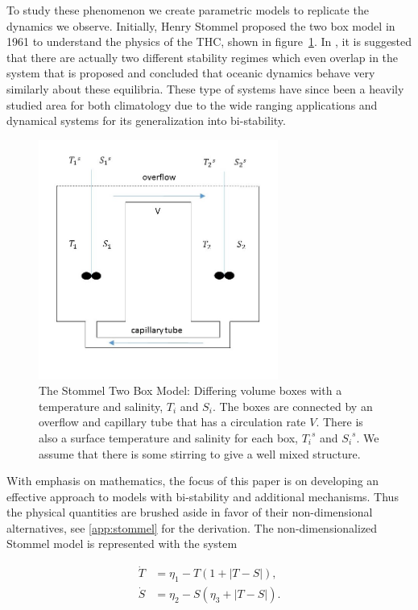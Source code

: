 To study these phenomenon we create parametric models to replicate the dynamics we observe. Initially, Henry Stommel proposed the two box model in 1961 to understand the physics of the THC, shown in figure~\ref{fig:stommel_boxes}. In \cite{stommel1961thermohaline}, it is suggested that there are actually two different stability regimes which even overlap in the system that is proposed and concluded that oceanic dynamics behave very similarly about these equilibria. These type of systems have since been a heavily studied area for both climatology due to the wide ranging applications and dynamical systems for its generalization into bi-stability.

\begin{figure}[H]
\centering
\includegraphics[width=0.7\textwidth]{intro/Box.jpg}
\caption{The Stommel Two Box Model: Differing volume boxes with a temperature and salinity, $T_i$ and $S_i$. The boxes are connected by an overflow and capillary tube that has a circulation rate $V$. There is also a surface temperature and salinity for each box, ${T_i}^s$ and ${S_i}^s$. We assume that there is some stirring to give a well mixed structure.}
\label{fig:stommel_boxes}
\end{figure}

With emphasis on mathematics, the focus of this paper is on developing an effective approach to models with bi-stability and additional mechanisms. Thus the physical quantities are brushed aside in favor of their non-dimensional alternatives, see \autoref{app:stommel} for the derivation. The non-dimensionalized Stommel model is represented with the system

\begin{equation}
 \begin{aligned}
  \dot{T} & = \eta_1-T(1+|T-S|), \\
  \dot{S}   & = \eta_2-S(\eta_3+|T-S|). 
 \end{aligned}
\end{equation}

